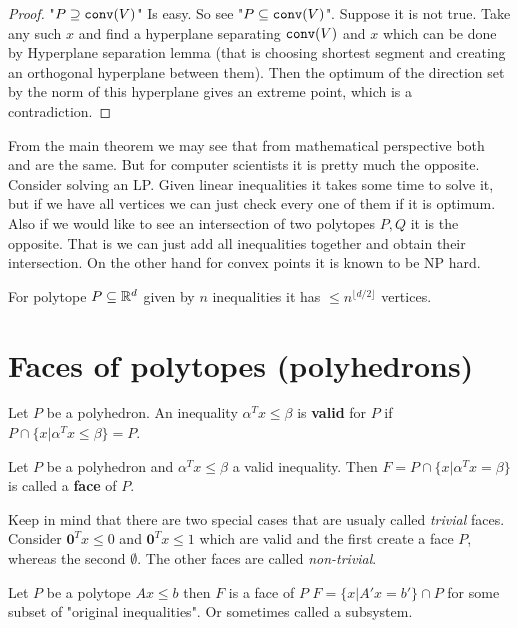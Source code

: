 \begin{proof}
	"$P \supseteq \mathtt{conv}(V)$" Is easy. So see "$P \subseteq \mathtt{conv}(V)$". Suppose it is not true. Take any such $x$ and find a hyperplane separating $\mathtt{conv}(V)$ and $x$ which can be done by Hyperplane separation lemma (that is choosing shortest segment and creating an orthogonal hyperplane between them). Then the optimum of the direction set by the norm of this hyperplane gives an extreme point, which is a contradiction.
\end{proof}

From the main theorem we may see that from mathematical perspective both  and  are the same. But for computer scientists it is pretty much the opposite. Consider solving an LP. Given linear inequalities it takes some time to solve it, but if we have all vertices we can just check every one of them if it is optimum. Also if we would like to see an intersection of two polytopes $P,Q$ it is the opposite. That is we can just add all inequalities together and obtain their intersection. On the other hand for convex points it is known to be NP hard.

\begin{fact}
	For polytope $P \subseteq \mathbb{R}^{d}$ given by $n$ inequalities it has $\leq n^{\lfloor d/2 \rfloor}$ vertices.
\end{fact}

\section{Faces of polytopes (polyhedrons)}

\begin{defn}
	Let $P$ be a polyhedron. An inequality $\alpha^{T} x \leq \beta$ is \textbf{valid} for $P$ if $P \cap \{x | \alpha^{T} x \leq \beta\} = P$.
\end{defn}

\begin{defn}
	Let $P$ be a polyhedron and $\alpha^{T} x \leq \beta$ a valid inequality. Then $F = P \cap \{x | \alpha^{T} x = \beta\}$ is called a \textbf{face} of $P$.
\end{defn}

Keep in mind that there are two special cases that are usualy called \textit{trivial} faces. Consider $\bm{0}^{T} x \leq 0$ and $\bm{0}^{T} x \leq 1$ which are valid and the first create a face $P$, whereas the second $\emptyset$. The other faces are called \textit{non-trivial}.

\begin{thm}
	Let $P$ be a polytope $A x \leq b$ then $F$ is a face of $P$ \ifft $F = \{x | A' x = b'\} \cap P$ for some subset of "original inequalities". Or sometimes called a subsystem.
\end{thm}

